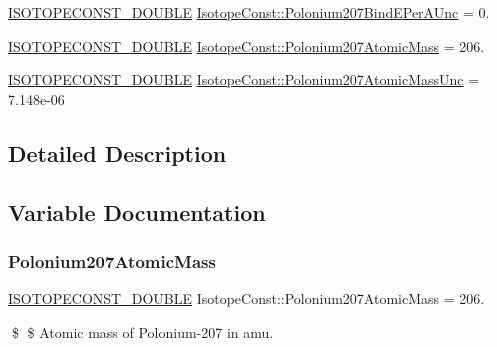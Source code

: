 \begin{DoxyCompactItemize}
\mbox{\hyperlink{group___isotope_const-_macros_ga8f45a7272ce02c0b4c65c44636ed719a}{I\+S\+O\+T\+O\+P\+E\+C\+O\+N\+S\+T\+\_\+\+D\+O\+U\+B\+LE}} \mbox{\hyperlink{group___isotope_const-_polonium-_po207_gab86a776abba885d12548176ccf3b5780}{Isotope\+Const\+::\+Polonium207\+Bind\+E\+Per\+A\+Unc}} = 0.
\item 
\mbox{\hyperlink{group___isotope_const-_macros_ga8f45a7272ce02c0b4c65c44636ed719a}{I\+S\+O\+T\+O\+P\+E\+C\+O\+N\+S\+T\+\_\+\+D\+O\+U\+B\+LE}} \mbox{\hyperlink{group___isotope_const-_polonium-_po207_ga66354bfd6b2cf9dc9a0cd9cb0f36648d}{Isotope\+Const\+::\+Polonium207\+Atomic\+Mass}} = 206.
\item 
\mbox{\hyperlink{group___isotope_const-_macros_ga8f45a7272ce02c0b4c65c44636ed719a}{I\+S\+O\+T\+O\+P\+E\+C\+O\+N\+S\+T\+\_\+\+D\+O\+U\+B\+LE}} \mbox{\hyperlink{group___isotope_const-_polonium-_po207_ga1a3d471b8defb5dfd8fe398ba0a59867}{Isotope\+Const\+::\+Polonium207\+Atomic\+Mass\+Unc}} = 7.\+148e-\/06
\end{DoxyCompactItemize}


\subsection{Detailed Description}


\subsection{Variable Documentation}
\mbox{\label{group___isotope_const-_polonium-_po207_ga66354bfd6b2cf9dc9a0cd9cb0f36648d}} 
\subsubsection{\texorpdfstring{Polonium207\+Atomic\+Mass}{Polonium207AtomicMass}}
{\footnotesize\ttfamily \mbox{\hyperlink{group___isotope_const-_macros_ga8f45a7272ce02c0b4c65c44636ed719a}{I\+S\+O\+T\+O\+P\+E\+C\+O\+N\+S\+T\+\_\+\+D\+O\+U\+B\+LE}} Isotope\+Const\+::\+Polonium207\+Atomic\+Mass = 206.}

\$ \$ Atomic mass of Polonium-\/207 in amu. \mbox{\label{group___isotope_const-_polonium-_po207_ga1a3d471b8defb5dfd8fe398ba0a59867}} 
